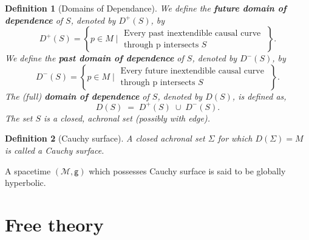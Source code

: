 \documentclass[11pt]{book}
\newcommand{\Mcal}{\mathcal{M}}
\newcommand{\gsf}{\mathsf{g}}
\theoremstyle{break}
\newtheorem{definition}{Definition}
\begin{document}
\begin{definition}[Domains of Dependance]
We define the \textbf{future domain of dependence} of $S$, denoted by $D^{+}(S)$, by
\begin{equation*}
 D^{+}(S) = \left\{ p \in M \; \bigg| \; \begin{array}{l} \text{Every past inextendible causal curve} \\ \text{through p intersects $S$} \end{array} \; \right\}.
\end{equation*}
We define the \textbf{past domain of dependence} of $S$, denoted by $D^{-}(S)$, by
\begin{equation*}
 D^{-}(S) = \left\{ p \in M \; \bigg| \; \begin{array}{l} \text{Every future inextendible causal curve} \\ \text{through p intersects $S$} \end{array} \; \right\}.
\end{equation*}
The (full) \textbf{domain of dependence} of $S$, denoted by $D(S)$, is defined as,
\begin{equation*}
D(S) \; = \; D^{+}(S) \; \cup \; D^{-}(S).
\end{equation*}
The set $S$ is a closed, achronal set (possibly with edge). 
\end{definition}

\begin{definition}[Cauchy surface]
A closed achronal set $\Sigma$ for which $D(\Sigma) = M$ is called a Cauchy surface. 
\end{definition}

A spacetime $(\Mcal,\gsf)$ which possesses Cauchy surface is said to be globally hyperbolic. \par



\chapter{Free theory}


\end{document}
